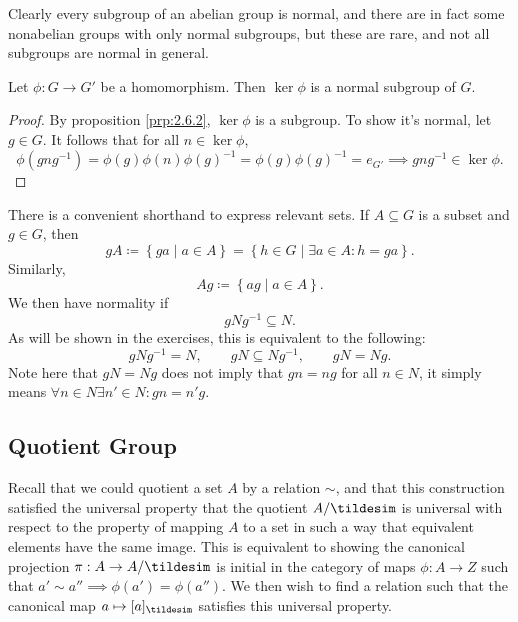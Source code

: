 Clearly every subgroup of an abelian group is normal, and there are in fact some nonabelian groups with only normal subgroups, but these are rare, and not all subgroups are normal in general.
\begin{lemma}\label{lma:2.7.1}
	Let $\phi : G \to G'$ be a homomorphism. Then $\ker \phi $ is a normal subgroup of $G$.
\end{lemma}
\begin{proof}
	By proposition \ref{prp:2.6.2}, $\ker \phi $ is a subgroup. To show it's normal, let $g\in G$. It follows that for all $n\in \ker \phi $,
	\[
		\phi (gng^{-1})=\phi (g)\phi (n)\phi (g)^{-1}=\phi (g)\phi (g)^{-1}=e_{G'}\implies gng^{-1}\in \ker \phi 
	.\]
\end{proof}
There is a convenient shorthand to express relevant sets. If $A\subseteq G$ is a subset and $g\in G$, then
\[
	gA\coloneqq \left\{ ga \mid a\in A \right\} =\left\{ h\in G \mid \exists a\in A: h=ga \right\} 
.\]
Similarly,
\[
	Ag\coloneqq \left\{ ag \mid a\in A \right\} 
.\]
We then have normality if
\[
	gNg^{-1}\subseteq N
.\]
As will be shown in the exercises, this is equivalent to the following:
\[
	gNg^{-1}=N,\qquad gN\subseteq Ng^{-1},\qquad gN=Ng
.\]
Note here that $gN=Ng$ does not imply that $gn=ng$ for all $n\in N$, it simply means  $\forall n\in N\exists n'\in N: g n=n'g$.
\subsection{Quotient Group}
Recall that we could quotient a set $A$ by a relation $\sim $, and that this construction satisfied the universal property that the quotient $A/\tildesim $ is universal with respect to the property of mapping $A$ to a set in such a way that equivalent elements have the same image. This is equivalent to showing the canonical projection $\pi : A \to A /\tildesim $ is initial in the category of maps $\phi : A \to Z$ such that $a'\sim a'' \implies \phi (a')=\phi (a'')$. We then wish to find a relation such that the canonical map $a\mapsto [a]_{\tildesim }$ satisfies this universal property.

